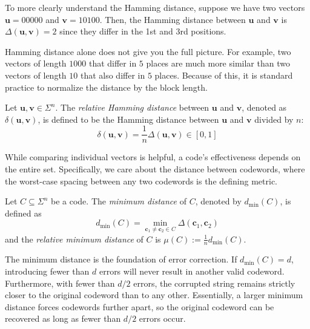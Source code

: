 \documentclass[../../book]{subfiles}
\begin{document}
To more clearly understand the Hamming distance, suppose we have two vectors $\mathbf{u}=00000$ and $\mathbf{v}=10100$. Then, the Hamming distance between $\mathbf{u}$ and $\mathbf{v}$ is $\Delta(\mathbf{u}, \mathbf{v})=2$ since they differ in the 1st and 3rd positions.

Hamming distance alone does not give you the full picture. For example, two vectors of length $1000$ that differ in $5$ places are much more similar than two vectors of length $10$ that also differ in $5$ places. Because of this, it is standard practice to normalize the distance by the block length.

\begin{definition}\label{def:rel-distance}
  Let $\mathbf{u}, \mathbf{v} \in \Sigma^n$. The \emph{relative Hamming distance} between $\mathbf{u}$ and $\mathbf{v}$, denoted as $\delta(\mathbf{u}, \mathbf{v})$, is defined to be the Hamming distance between $\mathbf{u}$ and $\mathbf{v}$ divided by $n$:
  \begin{equation*}
    \delta(\mathbf{u}, \mathbf{v}) = \frac{1}{n} \Delta(\mathbf{u}, \mathbf{v}) \in [0,1]
  \end{equation*}
\end{definition}

While comparing individual vectors is helpful, a code's effectiveness depends on the entire set. Specifically, we care about the distance between codewords, where the worst-case spacing between any two codewords is the defining metric.
\begin{definition}\label{def:min-distance}
  Let $C\subseteq \Sigma^n$ be a code. The \emph{minimum distance} of $C$, denoted by $d_{\min}(C)$, is defined as 
  \begin{equation*}
    d_{\min}(C) = \min_{\mathbf{c}_1\neq \mathbf{c}_2 \in C} \Delta(\mathbf{c}_1, \mathbf{c}_2)
  \end{equation*}
    and the \emph{relative minimum distance} of $C$ is $\mu(C) := \frac{1}{n} d_{\min}(C)$.
\end{definition}

The minimum distance is the foundation of error correction. If $d_{\min}(C) = d$, introducing fewer than $d$ errors will never result in another valid codeword. Furthermore, with fewer than $d/2$ errors, the corrupted string remains strictly closer to the original codeword than to any other. Essentially, a larger minimum distance forces codewords further apart, so the original codeword can be recovered as long as fewer than $d/2$ errors occur.
\end{document}
